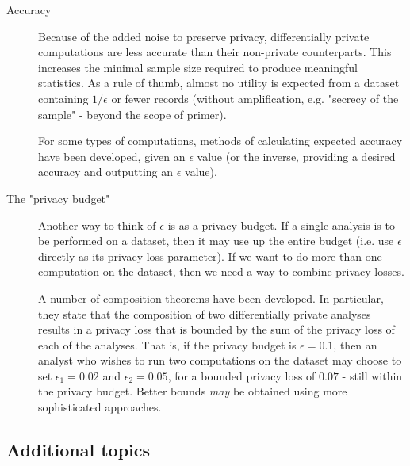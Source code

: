 \documentclass[a4paper]{article}
\begin{document}
\begin{description}
    \item[Accuracy] Because of the added noise to preserve privacy, differentially private computations are less accurate than their non-private counterparts. This increases the minimal sample size required to produce meaningful statistics. As a rule of thumb, almost no utility is expected from a dataset containing $1/\epsilon$ or fewer records (without amplification, e.g. "secrecy of the sample" - beyond the scope of primer).
    
    For some types of computations, methods of calculating expected accuracy have been developed, given an $\epsilon$ value (or the inverse, providing a desired accuracy and outputting an $\epsilon$ value).
    
    \item[The "privacy budget"] Another way to think of $\epsilon$ is as a privacy budget. If a single analysis is to be performed on a dataset, then it may use up the entire budget (i.e. use $\epsilon$ directly as its privacy loss parameter). If we want to do more than one computation on the dataset, then we need a way to combine privacy losses.
    
    A number of composition theorems have been developed. In particular, they state that the composition of two differentially private analyses results in a privacy loss that is bounded by the sum of the privacy loss of each of the analyses. That is, if the privacy budget is $\epsilon = 0.1$, then an analyst who wishes to run two computations on the dataset may choose to set $\epsilon_1 = 0.02$ and $\epsilon_2 = 0.05$, for a bounded privacy loss of $0.07$ - still within the privacy budget. Better bounds \textit{may} be obtained using more sophisticated approaches.
\end{description}

\subsection{Additional topics}
\end{document}

